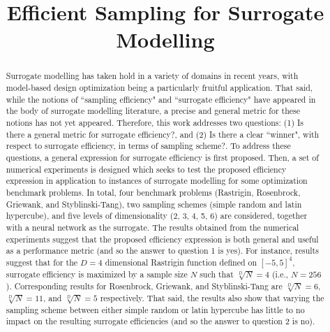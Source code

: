 \documentclass[conference]{IEEEtran}
\begin{document}

\title{Efficient Sampling for Surrogate Modelling}

\author{
}

\maketitle

\thispagestyle{plain}
\pagestyle{plain}



\begin{abstract}
Surrogate modelling has taken hold in a variety of domains in recent years, with model-based design optimization being a particularly fruitful application. That said, while the notions of ``sampling efficiency" and ``surrogate efficiency" have appeared in the body of surrogate modelling literature, a precise and general metric for these notions has not yet appeared. Therefore, this work addresses two questions: (1) Is there a general metric for surrogate efficiency?, and (2) Is there a clear ``winner", with respect to surrogate efficiency, in terms of sampling scheme?. To address these questions, a general expression for surrogate efficiency is first proposed. Then, a set of numerical experiments is designed which seeks to test the proposed efficiency expression in application to instances of surrogate modelling for some optimization benchmark problems. In total, four benchmark problems (Rastrigin, Rosenbrock, Griewank, and Styblinski-Tang), two sampling schemes (simple random and latin hypercube), and five levels of dimensionality (2, 3, 4, 5, 6) are considered, together with a neural network as the surrogate. The results obtained from the numerical experiments suggest that the proposed efficiency expression is both general and useful as a performance metric (and so the answer to question 1 is yes). For instance, results suggest that for the $D = 4$ dimensional Rastrigin function defined on $[-5, 5]^4$, surrogate efficiency is maximized by a sample size $N$ such that $\sqrt[D]{N} = 4$ (i.e., $N = 256$). Corresponding results for Rosenbrock, Griewank, and Styblinski-Tang are $\sqrt[D]{N} = 6$, $\sqrt[D]{N} = 11$, and $\sqrt[D]{N} = 5$ respectively. That said, the results also show that varying the sampling scheme between either simple random or latin hypercube has little to no impact on the resulting surrogate efficiencies (and so the answer to question 2 is no).
\end{abstract}
\end{document}
